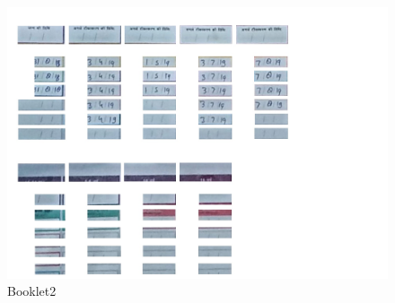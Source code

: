 \documentclass{article}
\begin{document}
    \begin{figure}[!htb]
    \minipage{\textwidth}
    \begin{center}
      \includegraphics[scale=.25]{4/.report/_segmented/_mask/b2.jpg}
      \caption{Booklet2}
    \end{center}
    \endminipage
    \end{figure}
    \pagebreak
\end{document}
